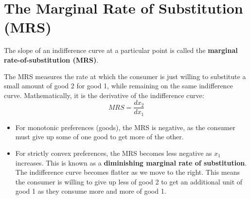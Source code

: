 \section{The Marginal Rate of Substitution (MRS)}\label{sec:mrs}
The slope of an indifference curve at a particular point is called the \textbf{marginal rate-of-substitution (MRS)}.
\begin{definition}[MRS]
The MRS measures the rate at which the consumer is just willing to substitute a small amount of good 2 for good 1, while remaining on the same indifference curve. Mathematically, it is the derivative of the indifference curve:
\[ MRS = \frac{dx_2}{dx_1} \]
\end{definition}
\begin{itemize}
    \item For monotonic preferences (goods), the MRS is negative, as the consumer must give up some of one good to get more of the other.
    \item For strictly convex preferences, the MRS becomes less negative as $x_1$ increases. This is known as a \textbf{diminishing marginal rate of substitution}. The indifference curve becomes flatter as we move to the right. This means the consumer is willing to give up less of good 2 to get an additional unit of good 1 as they consume more and more of good 1.
\end{itemize}